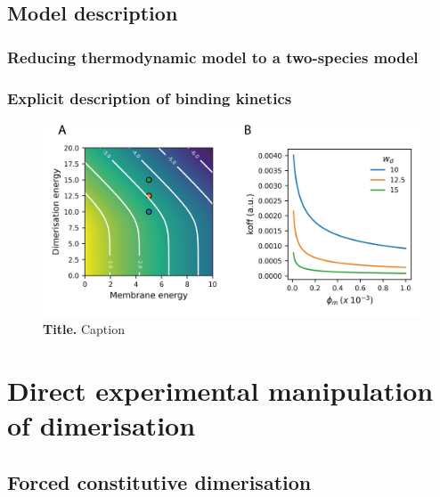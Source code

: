 \documentclass[12pt]{"article"}
\newcommand{\mycaption}[2]{\caption[#1]{\textbf{#1.} #2}}
\begin{document}
\subsection{Model description}

\subsubsection{Reducing thermodynamic model to a two-species model} 



\subsubsection{Explicit description of binding kinetics} 

\begin{figure}[!h]
\includegraphics[scale=0.9]{thermodynamic_model_koff}
\setlength{\abovecaptionskip}{20pt}
\centering
\mycaption{Title}{Caption}
\end{figure}


\clearpage
\section{Direct experimental manipulation of dimerisation}

\subsection{Forced constitutive dimerisation}


\end{document}
